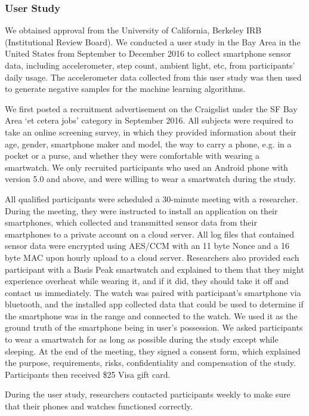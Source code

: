 \documentclass{soups}
\begin{document}
\subsubsection{User Study}
We obtained approval from the University of California, Berkeley IRB (Institutional Review Board). We conducted a user study in the Bay Area in the United States from September to December 2016 to collect smartphone sensor data, including accelerometer, step count, ambient light, etc, from participants' daily usage. The accelerometer data collected from this user study was then used to generate negative samples for the machine learning algorithms.

We first posted a recruitment advertisement on the Craigslist under the SF Bay Area `et cetera jobs' category in September 2016. All subjects were required to take an online screening survey, in which they provided information about their age, gender, smartphone maker and model, the way to carry a phone, e.g. in a pocket or a purse, and whether they were comfortable with wearing a smartwatch. We only recruited participants who used an Android phone with version 5.0 and above, and were willing to wear a smartwatch during the study.

All qualified participants were scheduled a 30-minute meeting with a researcher. During the meeting, they were instructed to install an application on their smartphones, which collected and transmitted sensor data from their smartphones to a private account on a cloud server. All log files that contained sensor data were encrypted using AES/CCM with an 11 byte Nonce and a 16 byte MAC upon hourly upload to a cloud server. Researchers also provided each participant with a Basis Peak smartwatch and explained to them that they might experience overheat while wearing it, and if it did, they should take it off and contact us immediately. The watch was paired with participant's smartphone via bluetooth, and the installed app collected data that could be used to determine if the smartphone was in the range and connected to the watch. We used it as the ground truth of the smartphone being in user's possession. We asked participants to wear a smartwatch for as long as possible during the study except while sleeping. At the end of the meeting, they signed a consent form, which explained the purpose, requirements, risks, confidentiality and compensation of the study. Participants then received \$25 Visa gift card.

During the user study, researchers contacted participants weekly to make sure that their phones and watches functioned correctly.
\end{document}
